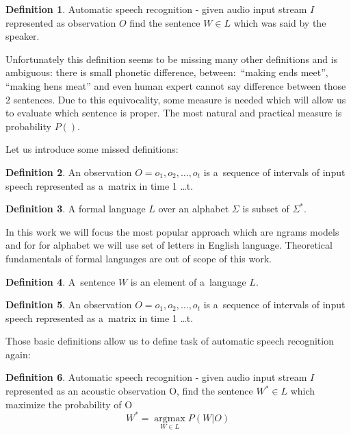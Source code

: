 \documentclass[a4paper]{report}
\theoremstyle{definition}
\newtheorem{definition}{Definition}[chapter]
\begin{document}
\begin{definition}
	Automatic speech recognition - given audio input stream $I$ represented as observation $O$ find the sentence $W\in L$ which was said by the speaker. 
\end{definition}


Unfortunately this definition seems to be missing many other definitions and is ambiguous: there is small phonetic difference, between:~``making ends meet'', ``making hens meat'' and even human expert cannot say difference between those 2 sentences. Due to this equivocality, some measure is needed which will allow us to evaluate which sentence is proper. The most natural and practical measure is probability $P()$.


Let us introduce some missed definitions:

\begin{definition}
	An observation $O = o_1,o_2,\dots,o_t$ is a~sequence of intervals of input speech represented as a~matrix in time 1 \dots t.
\end{definition}

\begin{definition}
	A formal language $L$ over an alphabet $\Sigma$ is subset of $\Sigma^*$.
\end{definition}

In this work we will focus the most popular approach which are n\dywiz grams models and for for alphabet we will use set of letters in English language. Theoretical fundamentals of formal languages are out of scope of this work.

\begin{definition}
	A~sentence $W$ is an element of a~language $L$.	
\end{definition}

\begin{definition}
	An observation $O = o_1,o_2,\dots,o_t$ is a~sequence of intervals of input speech represented as a~matrix in time 1 \dots  t.
\end{definition}

Those basic definitions allow us to define task of automatic speech recognition again: 

\begin{definition}
	Automatic speech recognition - given audio input stream $I$ represented as an acoustic observation O, find the sentence $W^* \in L$ which maximize the probability of O
\begin{equation} 
W^*=\underset{W \in L}{\operatorname{argmax}} P(W|O)
\end{equation}

\end{definition}
\end{document}
